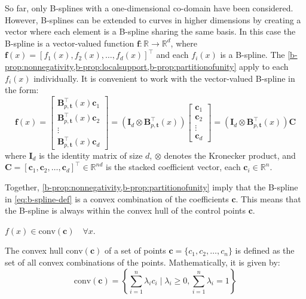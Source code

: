 So far, only B-splines with a one-dimensional co-domain have been considered. However, B-splines can be extended to curves in higher dimensions by creating a vector where each element is a B-spline sharing the same basis. In this case the B-spline is a vector-valued function $\mathbf{f}: \mathbb R \rightarrow \mathbb R^d$, where $\mathbf{f}(x) = [f_1(x), f_2(x), \dots, f_d(x)]^\top$ and each $f_i(x)$ is a B-spline. The \cref{b-prop:nonnegativity,b-prop:localsupport,b-prop:partitionofunity} apply to each $f_i(x)$ individually. It is convenient to work with the vector-valued B-spline in the form:
\begin{equation}\label{eq:b-spline-vector-valued}
    \mathbf f(x) = \begin{bmatrix}
        \mathbf{B}_{p, \mathbf{t}}^\top(x) \mathbf c_1 \\
        \mathbf{B}_{p, \mathbf{t}}^\top(x) \mathbf c_2 \\
        \vdots \\
        \mathbf{B}_{p, \mathbf{t}}^\top(x) \mathbf c_d
    \end{bmatrix}
    = 
    (\mathbf{I}_d \otimes \mathbf{B}_{p, \mathbf{t}}^\top(x)) 
    \begin{bmatrix}
        \mathbf c_1 \\
        \mathbf c_2 \\
        \vdots \\
        \mathbf c_d
    \end{bmatrix} 
    = (\mathbf{I}_d \otimes \mathbf{B}_{p, \mathbf{t}}^\top(x)) \mathbf C
\end{equation}
where $\mathbf{I}_d$ is the identity matrix of size $d$, $\otimes$ denotes the Kronecker product, and $\mathbf{C} = [\mathbf c_1, \mathbf c_2, \ldots, \mathbf c_d]^\top\in\mathbb R^{nd}$ is the stacked coefficient vector, each $\mathbf c_i \in \mathbb R^n$.


Together, \cref{b-prop:nonnegativity,b-prop:partitionofunity} imply that the B-spline in \cref{eq:b-spline-def} is a convex combination of the coefficients $\mathbf c$. This means that the B-spline is always within the convex hull of the control points $\mathbf c$.

\begin{property}\label{b-prop:convexhull}
    $f(x) \in \text{conv}(\mathbf{c})
    \quad\forall x$.
\end{property}

The convex hull $\text{conv}(\mathbf{c})$ of a set of points $\mathbf{c} = \{c_1, c_2, \ldots, c_n\}$ is defined as the set of all convex combinations of the points. Mathematically, it is given by:
\begin{equation}
    \text{conv}(\mathbf{c}) = \left\{ \sum_{i=1}^n \lambda_i c_i \mid \lambda_i \geq 0, \sum_{i=1}^n \lambda_i = 1 \right\}
\end{equation}

